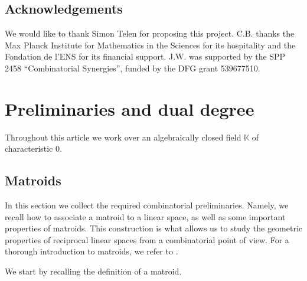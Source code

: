 \documentclass[12pt,a4paper,english]{scrartcl}
\newcommand{\KK}{\mathbb{K}}
\begin{document}
\subsection*{Acknowledgements}
We would like to thank Simon Telen for proposing this project. C.B. thanks the Max Planck Institute for Mathematics in the Sciences for its hospitality and the Fondation de l'ENS for its financial support. J.W. was supported by the SPP 2458 “Combinatorial Synergies”,
funded by the DFG grant 539677510.

\section{Preliminaries and dual degree} \label{sec:warmup}

Throughout this article we work over an algebraically closed field $\KK$ of characteristic 0.

\subsection{Matroids}

In this section we collect the required combinatorial preliminaries. Namely, we recall how to associate a matroid to a linear space, as well as some important properties of matroids. This construction is what allows us to study the geometric properties of reciprocal linear spaces from a combinatorial point of view.
For a thorough introduction to matroids, we refer to \cite{oxley2006matroid}.  

We start by recalling the definition of a matroid.
\end{document}
